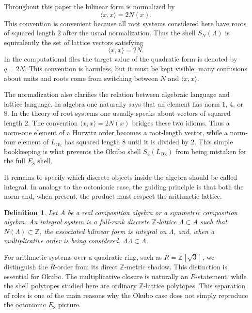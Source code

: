 \documentclass{birkjour}
\newtheorem{definition}[theorem]{Definition}
\newcommand{\LOk}{L_{\mathrm{Ok}}}
\newcommand{\ZZ}{\mathbb Z}
\numberwithin{equation}{section}
\begin{document}
Throughout this paper the bilinear form is normalized by
\begin{equation}
\langle x,x\rangle=2N(x).
\end{equation}
This convention is convenient because all root systems considered here have
roots of squared length \(2\) after the usual normalization. Thus the shell
\(S_N(\Lambda)\) is equivalently the set of lattice vectors satisfying
\begin{equation}
\langle x,x\rangle=2N.
\end{equation}
In the computational files the target value of the quadratic form is denoted
by \(q=2N\). This convention is harmless, but it must be kept visible: many
confusions about units and roots come from switching between \(N\) and
\(\langle x,x\rangle\).

The normalization also clarifies the relation between algebraic language and
lattice language. In algebra one naturally says that an element has norm
\(1\), \(4\), or \(8\). In the theory of root systems one usually speaks about
vectors of squared length \(2\). The convention \(\langle x,x\rangle=2N(x)\)
bridges these two idioms. Thus a norm-one element of a Hurwitz order becomes a
root-length vector, while a norm-four element of \(\LOk\) has squared length
\(8\) until it is divided by \(2\). This simple bookkeeping is what prevents
the Okubo shell \(S_4(\LOk)\) from being mistaken for the full \(E_8\) shell.

It remains to specify which discrete objects inside the algebra should be
called integral. In analogy to the octonionic case, the guiding principle is
that both the norm and, when present, the product must respect the arithmetic
lattice.

\begin{definition}
Let \(A\) be a real composition algebra or a symmetric composition algebra. An
integral system is a full-rank discrete \(\ZZ\)-lattice \(\Lambda\subset A\)
such that \(N(\Lambda)\subset\ZZ\), the associated bilinear form is integral
on \(\Lambda\), and, when a multiplicative order is being considered,
\(\Lambda\Lambda\subset\Lambda\).
\end{definition}

For arithmetic systems over a quadratic ring, such as \(R=\ZZ[\sqrt3]\), we
distinguish the \(R\)-order from its direct \(\ZZ\)-metric shadow. This
distinction is essential for Okubo. The multiplicative closure is naturally an
\(R\)-statement, while the shell polytopes studied here are ordinary
\(\ZZ\)-lattice polytopes. This separation of roles is one of the main reasons
why the Okubo case does not simply reproduce the octonionic \(E_8\) picture.
\end{document}
